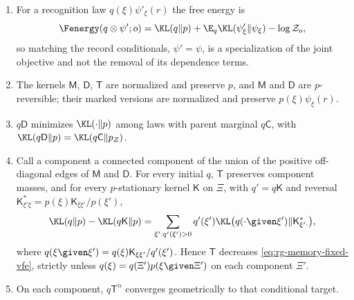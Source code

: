 \begin{enumerate}
\item[(i)] For a recognition law $q(\xi)\psi'_\xi(r)$ the free energy is
\begin{equation}
\Fenergy(q\otimes\psi';o)=\KL(q\Vert p)+\E_q\KL(\psi'_\xi\Vert\psi_\xi)
-\log\mathcal Z_o,
\label{eq:rg-memory-fixed-vfe}
\end{equation}
so matching the record conditionals, $\psi'=\psi$, is a specialization of the
joint objective and not the removal of its dependence terms.
\item[(ii)] The kernels $\mathsf M$, $\mathsf D$, $\mathsf T$ are normalized and
preserve $p$, and $\mathsf M$ and $\mathsf D$ are $p$-reversible; their marked
versions are normalized and preserve $p(\xi)\psi_\xi(r)$.
\item[(iii)] $q\mathsf D$ minimizes $\KL(\cdot\Vert p)$ among laws with parent
marginal $q\mathsf C$, with $\KL(q\mathsf D\Vert p)=\KL(q\mathsf C\Vert p_Z)$.
\item[(iv)] Call a component a connected component of the union of the positive
off-diagonal edges of $\mathsf M$ and $\mathsf D$. For every initial $q$, $\mathsf T$
preserves component masses, and for every $p$-stationary kernel $\mathsf K$ on
$\Xi$, with $q'=q\mathsf K$ and reversal
$\mathsf K^*_{\xi'\xi}=p(\xi)\mathsf K_{\xi\xi'}/p(\xi')$,
\begin{equation}
\KL(q\Vert p)-\KL(q\mathsf K\Vert p)
=\sum_{\xi':q'(\xi')>0}q'(\xi')
\KL\bigl(q(\cdot\given\xi')\Vert\mathsf K^*_{\xi'\cdot}\bigr),
\label{eq:rg-memory-reverse-conditional-loss}
\end{equation}
where $q(\xi\given\xi')=q(\xi)\mathsf K_{\xi\xi'}/q'(\xi')$. Hence $\mathsf T$
decreases \eqref{eq:rg-memory-fixed-vfe}, strictly unless
$q(\xi)=q(\Xi')p(\xi\given\Xi')$ on each component $\Xi'$.
\item[(v)] On each component, $q\mathsf T^n$ converges geometrically to that
conditional target.
\end{enumerate}

